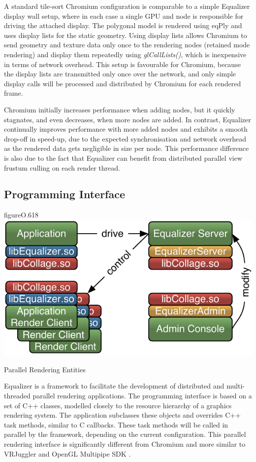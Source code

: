 A standard tile-sort Chromium configuration is comparable to a simple Equalizer
display wall setup, where in each case a single GPU and node is responsible for
driving the attached display. The polygonal model is rendered using eqPly and
uses display lists for the static geometry. Using display lists allows Chromium
to send geometry and texture data only once to the rendering nodes (retained mode
rendering) and display them repeatedly using {\em glCallLists()}, which is
inexpensive in terms of network overhead. This setup is favourable for Chromium,
because the display lists are transmitted only once over the network,
and only simple display calls will be processed and distributed by Chromium for
each rendered frame.

Chromium initially increases performance when adding nodes, but it quickly
stagnates, and even decreases, when more nodes are added. In contrast, Equalizer
continually improves performance with more added nodes and exhibits a smooth
drop-off in speed-up, due to the expected synchronisation and network overhead
as the rendered data gets negligible in size per node. This performance
difference is also due to the fact that Equalizer can benefit from distributed
parallel view frustum culling on each render thread.


\subsection{Programming Interface}

\begin{wrapfloat}{figure}{O}{.618\textwidth}
 \includegraphics[width=.618\textwidth]{images/processes}
 {\caption{\label{fProcessing}Parallel Rendering Entities}}
\end{wrapfloat}

Equalizer is a framework to facilitate the development of distributed and
multi-threaded parallel rendering applications. The programming interface is
based on a set of C++ classes, modelled closely to the resource hierarchy of a
graphics rendering system. The application subclasses these objects and
overrides C++ task methods, similar to C callbacks. These task methods will be
called in parallel by the framework, depending on the current configuration.
This parallel rendering interface is significantly different from Chromium
\cite{HHNFAKK:02} and more similar to VRJuggler \cite{BJHMBC:01} and OpenGL
Multipipe SDK \cite{BRE:05}.

